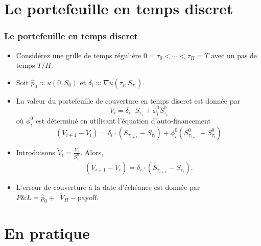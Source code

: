 \documentclass[10pt,color,leqno]{beamer}
\theoremstyle{plain}
\newcommand{\expp}[1]{\mathop {\mathrm{e}^{ #1}}}
\begin{document}
\section{Le portefeuille en temps discret}

\begin{frame}
  \frametitle{Le portefeuille en temps discret}

  \begin{itemize}
    \item Considérez une grille de temps régulière $0 = \tau_0 < \cdots < \tau_H = T$ avec un pas de temps $T/H$.
    \item Soit $\hat{p}_0 \approx u(0, S_0)$ et $\delta_i \approx \nabla u(\tau_i, S_{\tau_i})$.
    \item La valeur du portefeuille de couverture en temps discret est donnée par
      \begin{equation*}
        V_i = \delta_i \cdot S_{\tau_i} + \phi^0_i S^0_{\tau_i}
      \end{equation*}
      où $\phi^0_i$ est déterminé en utilisant l'équation d'auto-financement
      \begin{equation*}
        (V_{i+1} - V_i) = \delta_i \cdot (S_{\tau_{i+1}} - S_{\tau_{i}}) + \phi^0_i (S^0_{\tau_{i+1}} - S^0_{\tau_{i}})
      \end{equation*}
    \item Introduisons $\tilde V_i = \frac{V_i}{S^0_{\tau_i}}$. Alors,
      \begin{equation*}
        (\tilde V_{i+1} - \tilde V_{i}) = \delta_i \cdot (\tilde S_{\tau_{i+1}} - \tilde S_{\tau_i}).
      \end{equation*}
    \item L'erreur de couverture à la date d'échéance est donnée par $P\&L = \hat{p}_0 + \expp{r \tau_H} \tilde V_{H} - \text{payoff}$.
  \end{itemize}

\end{frame}

\section{En pratique}
\end{document}
